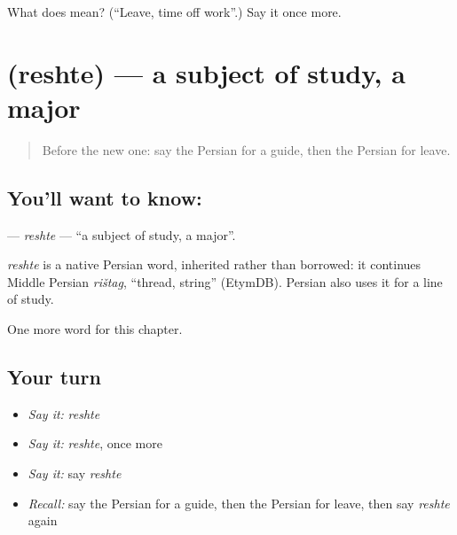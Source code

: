 \begin{tcolorbox}[breakable,colback=teal!4,colframe=teal!35!black,title={Before you move on}]
What does  mean? (\textquotedblleft{}Leave, time off work\textquotedblright{}.) Say it once more.
\end{tcolorbox}
\section[\texorpdfstring{\fa{رشته} (reshte)}{رشته (reshte)}]{ (reshte) — a subject of study, a major}

\label{lesson:FA-C177-reshte}



\begin{quote}
Before the new one: say the Persian for a guide, then the Persian for leave.
\end{quote}

\subsection*{You'll want to know: }
\textbf{} — \emph{reshte} — \textquotedblleft{}a subject of study, a major\textquotedblright{}.

\begin{cousinweb}
\emph{reshte} is a native Persian word, inherited rather than borrowed: it continues Middle Persian \emph{rištag}, \textquotedblleft{}thread, string\textquotedblright{} (EtymDB). Persian also uses it for a line of study.
\end{cousinweb}

\begin{grammarlens}[title={What you've built}]
One more word for this chapter.
\end{grammarlens}

\subsection*{Your turn}
\begin{itemize}
\raggedright
  \item \emph{Say it:} \emph{reshte}
  \item \emph{Say it:} \emph{reshte}, once more
  \item \emph{Say it:} say \emph{reshte}
  \item \emph{Recall:} say the Persian for a guide, then the Persian for leave, then say \emph{reshte} again
\end{itemize}

